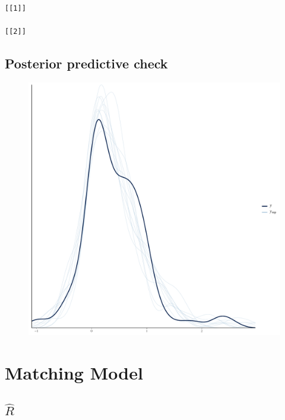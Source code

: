 \documentclass[
]{report}
\begin{document}
\begin{verbatim}
[[1]]

[[2]]
\end{verbatim}

\hypertarget{posterior-predictive-check-3}{%
\section{Posterior predictive
check}\label{posterior-predictive-check-3}}

\begin{figure}

{\centering \includegraphics[width=1\textwidth,height=\textheight]{diagnostic_plots_files/figure-pdf/unnamed-chunk-12-1.pdf}

}

\end{figure}

\hypertarget{matching-model}{%
\chapter{Matching Model}\label{matching-model}}

\hypertarget{hatr-4}{%
\section{\texorpdfstring{\(\hat{R}\)}{\textbackslash hat\{R\}}}\label{hatr-4}}
\end{document}
